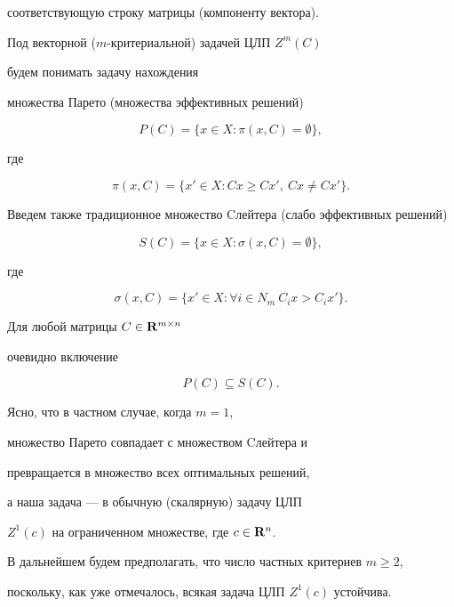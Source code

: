 соответствующую строку матрицы (компоненту вектора).





Под векторной ($m$-критериальной) задачей ЦЛП $Z^m(C)$


будем понимать задачу нахождения


множества Парето (множества эффективных решений)


$$


P(C) = \{x\in X: \pi(x, C)=\emptyset\},


$$


где


$$


\pi(x, C)=\{x'\in X: Cx\ge Cx',\ Cx\ne Cx'\}.


$$


Введем также традиционное множество Cлейтера (слабо эффективных решений)


$$


S(C) = \{x\in X: \sigma(x, C)=\emptyset\},


$$


где


$$


\sigma(x, C)=\{x'\in X: \forall i\in N_m\ C_ix> C_ix'\}.


$$





Для любой матрицы $C\in {\bold R}^{m\times n}$


очевидно включение


\begin{equation}


P(C)\subseteq S(C).


\end{equation}





Ясно, что в частном случае, когда $m=1$,


множество Парето совпадает с множеством Cлейтера и


превращается в множество всех оптимальных решений,


а наша задача --- в обычную (скалярную) задачу ЦЛП


$Z^1(c)$ на ограниченном множестве, где $c\in {\bold R}^n$.





В дальнейшем будем предполагать, что число частных критериев $m\ge 2$,


поскольку, как уже отмечалось, всякая задача ЦЛП $Z^1(c)$ устойчива.





